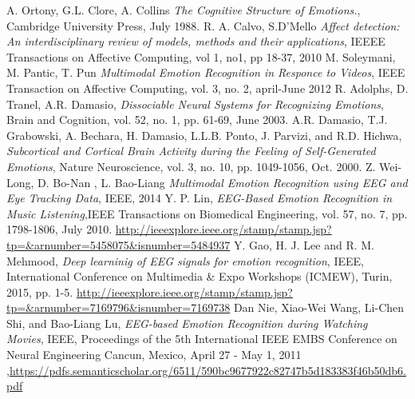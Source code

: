 \documentclass[10pt,journal,compsoc,twoside]{IEEEtran}
\begin{document}
\begin{thebibliography}{99}
A. Ortony, G.L. Clore, A. Collins \textit{The Cognitive Structure of Emotions.}, Cambridge University Press, July 1988.
 R. A. Calvo, S.D'Mello \textit{Affect detection: An interdisciplinary review of models, methods and their applications}, IEEEE Transactions on Affective Computing, vol 1, no1, pp 18-37, 2010
 M. Soleymani, M. Pantic, T. Pun \textit{Multimodal Emotion Recognition in Responce to Videos}, IEEE Transaction on Affective Computing, vol. 3, no. 2, april-June 2012
R. Adolphs, D. Tranel, A.R. Damasio, \textit{Dissociable Neural Systems for Recognizing Emotions}, Brain and Cognition, vol. 52, no. 1, pp. 61-69, June 2003.
 A.R. Damasio, T.J. Grabowski, A. Bechara, H. Damasio, L.L.B. Ponto, J. Parvizi, and R.D. Hichwa, \textit{Subcortical and Cortical Brain
Activity during the Feeling of Self-Generated Emotions}, Nature
Neuroscience, vol. 3, no. 10, pp. 1049-1056, Oct. 2000.
 Z. Wei-Long, D. Bo-Nan , L. Bao-Liang 
\textit{Multimodal Emotion Recognition using EEG and Eye Tracking Data}, IEEE, 2014
Y. P. Lin, \textit{EEG-Based Emotion Recognition in Music Listening},IEEE Transactions on Biomedical Engineering, vol. 57, no. 7, pp. 1798-1806, July 2010.
\url{http://ieeexplore.ieee.org/stamp/stamp.jsp?tp=&arnumber=5458075&isnumber=5484937}
Y. Gao, H. J. Lee and R. M. Mehmood, \textit{Deep learninig of EEG signals for emotion recognition}, IEEE, International Conference on Multimedia \& Expo Workshops (ICMEW), Turin, 2015, pp. 1-5.
\url{http://ieeexplore.ieee.org/stamp/stamp.jsp?tp=&arnumber=7169796&isnumber=7169738}
Dan Nie, Xiao-Wei Wang, Li-Chen Shi, and Bao-Liang Lu, \textit{EEG-based Emotion Recognition during Watching Movies}, IEEE, Proceedings of the 5th International IEEE EMBS Conference on Neural Engineering Cancun, Mexico, April 27 - May 1, 2011 ,\url{https://pdfs.semanticscholar.org/6511/590bc9677922c82747b5d183383f46b50db6.pdf}


\end{thebibliography}
\end{document}
